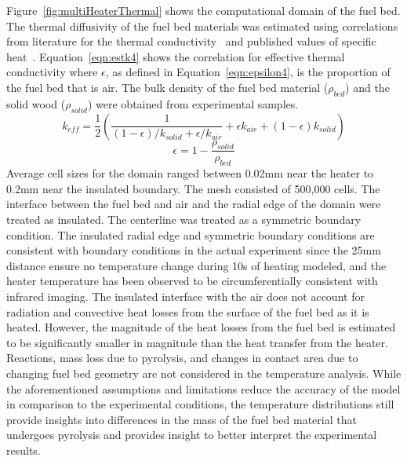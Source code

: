     Figure~\ref{fig:multiHeaterThermal} shows the computational domain of the fuel bed. The thermal diffusivity of the fuel bed materials was estimated using correlations from literature for the thermal conductivity~\cite{bergman2011fundamentals} and published values of specific heat~\cite{Parker1986}. Equation~\ref{eqn:estk4} shows the correlation for effective thermal conductivity where $\epsilon$, as defined in Equation~\ref{eqn:epsilon4}, is the proportion of the fuel bed that is air. The bulk density of the fuel bed material ($\rho_{bed}$) and the solid wood ($\rho_{solid}$) were obtained from experimental samples. 
        \begin{equation}
            k_{eff} = \frac{1}{2} \left(\frac{1}{\left( 1 - \epsilon \right)/k_{solid} + \epsilon/k_{air}} +  \epsilon k_{air} + \left(1-\epsilon \right) k_{solid} \right)
            \label{eqn:estk4}
        \end{equation}
        \begin{equation}
            \epsilon = 1- \frac{\rho_{solid}}{\rho_{bed}}
            \label{eqn:epsilon4}
        \end{equation}
    Average cell sizes for the domain ranged between 0.02\si{\milli\meter} near the heater to 0.2\si{\milli\meter} near the insulated boundary. The mesh consisted of 500,000 cells. The interface between the fuel bed and air and the radial edge of the domain were treated as insulated. The centerline was treated as a symmetric boundary condition. The insulated radial edge and symmetric boundary conditions are consistent with boundary conditions in the actual experiment since the 25\si{\milli\meter} distance ensure no temperature change during 10\si{\second} of heating modeled, and the heater temperature has been observed to be circumferentially consistent with infrared imaging. The insulated interface with the air does not account for radiation and convective heat losses from the surface of the fuel bed as it is heated. However, the magnitude of the heat losses from the fuel bed is estimated to be significantly smaller in magnitude than the heat transfer from the heater. Reactions, mass loss due to pyrolysis, and changes in contact area due to changing fuel bed geometry are not considered in the temperature analysis. While the aforementioned assumptions and limitations reduce the accuracy of the model in comparison to the experimental conditions, the temperature distributions still provide insights into differences in the mass of the fuel bed material that undergoes pyrolysis and provides insight to better interpret the experimental results. 
